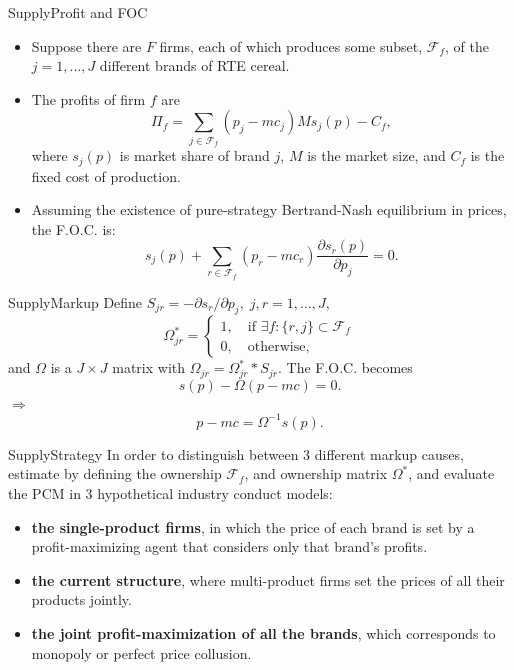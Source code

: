 \documentclass{beamer}
\begin{document}
\begin{frame}{Supply}{Profit and FOC}
	\begin{itemize}
		\item Suppose there are $F$ firms, each of which produces some subset, $\mathscr{F}_f$, of the $j=1,...,J$ different brands of RTE cereal.
		\item The profits of firm $f$ are
		\begin{equation}\nonumber
			\Pi_f=\sum_{j\in\mathscr{F}_f}(p_j-mc_j)Ms_j(p)-C_f,
		\end{equation}
		where $s_j(p)$ is market share of brand $j$, $M$ is the market size, and $C_f$ is the fixed cost of production.
		\item Assuming the existence of pure-strategy Bertrand-Nash equilibrium in prices, the F.O.C. is:
		\begin{equation}\nonumber
			s_j(p)+\sum_{r\in\mathscr{F}_f}(p_r-mc_r)\frac{\partial s_r(p)}{\partial p_j}=0.
		\end{equation}
	\end{itemize}
\end{frame}
\begin{frame}{Supply}{Markup}
	Define $S_{jr}=-\partial s_r/\partial p_j,\; j,r=1,...,J$,
	\begin{equation}\nonumber
		\Omega^*_{jr}=\begin{cases}
			1,\quad \mbox{if }\exists f:\{r,j\}\subset \mathscr{F}_f \\
			0,\quad \mbox{otherwise},
		\end{cases}
	\end{equation}
	and $\Omega$ is a $J\times J$ matrix with $\Omega_{jr}=\Omega^*_{jr}*S_{jr}$. The F.O.C. becomes
	\begin{equation}\nonumber
		s(p)-\Omega(p-mc)=0.
	\end{equation}
	$\Rightarrow$
	\begin{equation}
		p-mc=\Omega^{-1}s(p).
	\end{equation}
\end{frame}
\begin{frame}{Supply}{Strategy}
	In order to distinguish between 3 different markup causes, estimate by defining the ownership $\mathscr{F}_f$, and ownership matrix $\Omega^*$, and evaluate the PCM in 3 hypothetical industry conduct models:
	\medskip

	\begin{itemize}
		\item \textbf{the single-product firms}, in which the price of each brand is set by a profit-maximizing agent that considers only that brand's profits.
		\item \textbf{the current structure}, where multi-product firms set the prices of all their products jointly.
		\item \textbf{the joint profit-maximization of all the brands}, which corresponds to monopoly or perfect price collusion.
	\end{itemize}
\end{frame}
\end{document}
